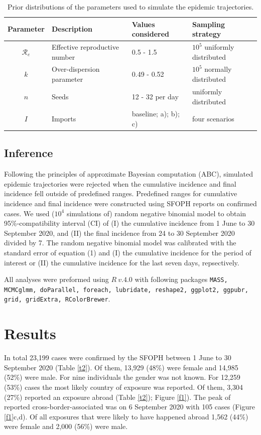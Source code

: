 \documentclass[10pt, a4paper, twoside]{article}
\begin{document}
\begin{table}
\centering
\begingroup\footnotesize
\begin{tabular}{clll}
	\hline
	Parameter & Description & Values considered & Sampling strategy\\
	\hline
	$\mathcal{R}_e$ & Effective reproductive number & 0.5 - 1.5 & $10^5$ uniformly distributed\\
	$k$ & Over-dispersion parameter & 0.49 - 0.52 & $10^5$ normally distributed\\
	$n$ & Seeds & 12 - 32 per day & uniformly distributed\\
	$I$ & Imports & baseline; a); b); c) & four scenarios\\
	\hline
\end{tabular}
\endgroup
\caption{Prior distributions of the parameters used to simulate the epidemic trajectories.} 
\label{t1}
\end{table}
\begin{multicols}{2}

\subsection{Inference}
Following the principles of approximate Bayesian computation (ABC), simulated epidemic trajectories were rejected when the cumulative incidence and final incidence fell outside of predefined ranges.
Predefined ranges for cumulative incidence and final incidence were constructed using SFOPH reports on confirmed cases.
We used ($10^4$ simulations of) random negative binomial model to obtain 95\%-compatibility interval (CI) of (I) the cumulative incidence from 1 June to 30 September 2020, and (II) the final incidence from 24 to 30 September 2020 divided by 7.
The random negative binomial model was calibrated with the standard error of equation (1) and (I) the cumulative incidence for the period of interest or (II) the cumulative incidence for the last seven days, repsectively.

All analyses were preformed using $R~v.4.0$ with following packages \texttt{MASS, MCMCglmm, doParallel, foreach, lubridate, reshape2, ggplot2, ggpubr, grid, gridExtra, RColorBrewer}.\cite{r_core_team_r_2020}%

\section{Results}
In total 23,199 cases were confirmed by the SFOPH between 1 June to 30 September 2020 (Table \ref{t2}). 
Of them, 13,929 (48\%) were female and 14,985 (52\%) were male.
For nine individuals the gender was not known.
For 12,259 (53\%) cases the most likely country of exposure was reported.
Of them, 3,304 (27\%) reported an exposure abroad (Table \ref{t2}); Figure \ref{f1}).
The peak of reported cross-border-associated was on 6 September 2020 with 105 cases (Figure \ref{f1}c,d).
Of all exposures that were likely to have happened abroad 1,562 (44\%) were female and 2,000 (56\%) were male.

\end{multicols}
\end{document}

